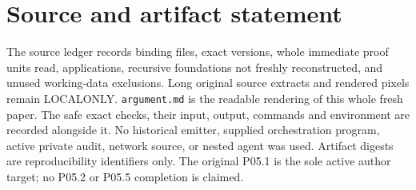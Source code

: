 \documentclass[11pt]{article}
\theoremstyle{definition}\newtheorem{definition}[theorem]{Definition}
\theoremstyle{remark}\newtheorem{remark}[theorem]{Remark}
\begin{document}
\section*{Source and artifact statement}
The source ledger records binding files, exact versions, whole immediate proof units read, applications, recursive foundations not freshly reconstructed, and unused working-data exclusions. Long original source extracts and rendered pixels remain LOCALONLY. \texttt{argument.md} is the readable rendering of this whole fresh paper. The safe exact checks, their input, output, commands and environment are recorded alongside it. No historical emitter, supplied orchestration program, active private audit, network source, or nested agent was used. Artifact digests are reproducibility identifiers only. The original P05.1 is the sole active author target; no P05.2 or P05.5 completion is claimed.
\end{document}
